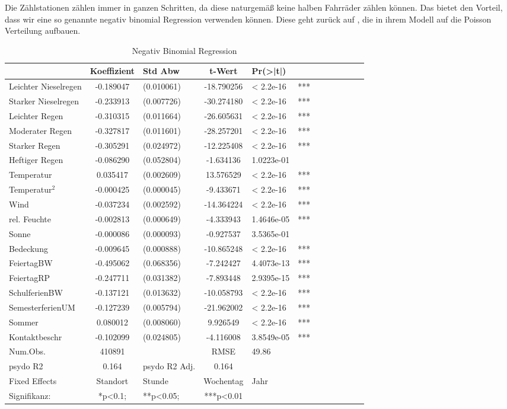 \documentclass[a4paper,12pt]{thesis}
\begin{document}
Die Zählstationen zählen immer in ganzen Schritten, da diese naturgemäß keine halben Fahrräder zählen können. Das bietet den Vorteil, dass wir eine so genannte negativ binomial Regression verwenden können. Diese geht zurück auf \cite{Hausman1984}, die in ihrem Modell auf die Poisson Verteilung aufbauen.

\begin{table}[!htbp]
	\centering
	\caption{Negativ Binomial Regression}
	\begin{tabular}[t]{lc lc lc lc lc lc}
		\toprule
		& Koeffizient & Std Abw & t-Wert & Pr(>|t|) & \\
		\midrule
		Leichter Nieselregen & -0.189047 & (0.010061) & -18.790256 & < 2.2e-16 & *** \\
		Starker Nieselregen & -0.233913 & (0.007726) & -30.274180 & < 2.2e-16 & *** \\
		Leichter Regen & -0.310315 & (0.011664) & -26.605631 & < 2.2e-16 & *** \\
		Moderater Regen & -0.327817 & (0.011601) & -28.257201 & < 2.2e-16 & *** \\
		Starker Regen & -0.305291 & (0.024972) & -12.225408 & < 2.2e-16 & *** \\
		Heftiger Regen & -0.086290 & (0.052804) & -1.634136 & 1.0223e-01 & \\
		Temperatur & 0.035417 & (0.002609) & 13.576529 & < 2.2e-16 & *** \\
		Temperatur$^2$ & -0.000425 & (0.000045) & -9.433671 & < 2.2e-16 & *** \\
		Wind & -0.037234 & (0.002592) & -14.364224 & < 2.2e-16 & *** \\
		rel. Feuchte & -0.002813 & (0.000649) & -4.333943 & 1.4646e-05 & *** \\
		Sonne & -0.000086 & (0.000093) & -0.927537 & 3.5365e-01 & \\
		Bedeckung & -0.009645 & (0.000888) & -10.865248 & < 2.2e-16 & *** \\
		FeiertagBW & -0.495062 & (0.068356) & -7.242427 & 4.4073e-13 & *** \\
		FeiertagRP & -0.247711 & (0.031382) & -7.893448 & 2.9395e-15 & *** \\
		SchulferienBW & -0.137121 & (0.013632) & -10.058793 & < 2.2e-16 & *** \\
		SemesterferienUM & -0.127239 & (0.005794) & -21.962002 & < 2.2e-16 & *** \\
		Sommer & 0.080012 & (0.008060) & 9.926549 & < 2.2e-16 & *** \\
		Kontaktbeschr & -0.102099 & (0.024805) & -4.116008 & 3.8549e-05 & *** \\
		\midrule
		Num.Obs. & 410891& & RMSE & 49.86 & \\
		psydo R2 & 0.164 & psydo R2 Adj. & 0.164 &  & \\
		\bottomrule
		Fixed Effects & Standort & Stunde & Wochentag & Jahr & \\
		Signifikanz: & *p<0.1; & **p<0.05; &***p<0.01 & &\\
	\end{tabular}
\label{reg2}
\end{table}
\end{document}
